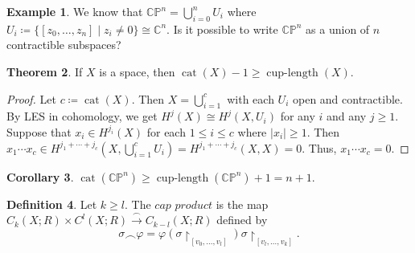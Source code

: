 \documentclass[10pt,letterpaper,cm]{nupset}
\theoremstyle{definition}
\newtheorem{definition}{Definition}[subsection]
\newtheorem{exmp}[definition]{Example}
\theoremstyle{theorem}
\newtheorem{theorem}[definition]{Theorem}
\newtheorem{corollary}[definition]{Corollary}
\theoremstyle{remark}
\newcommand{\C}{\mathbb C}
\newcommand{\CP}{\mathbb{CP}}
\newcommand{\1}{\mathbb{1}}
\newcommand{\0}{\vec 0}
\DeclareMathOperator{\clength}{cup{-}length}
\DeclareMathOperator{\cat}{cat}
\begin{document}
\begin{exmp}
We know that $\CP^n = \bigcup_{i=0}^n U_i$ where $U_i \coloneqq  \{[z_0, \ldots, z_n] \mid z_i \ne 0\} \cong \C^n$. Is it possible to write $\CP^n$ as a union of $n$ contractible subspaces?
\end{exmp}

\begin{theorem}
If $X$ is a space, then $\cat(X) -1 \geq \clength(X)$.
\end{theorem}
\begin{proof}
Let $c \coloneqq  \cat(X)$. Then $X = \bigcup_{i=1}^c$ with each $U_i$ open and contractible. By LES in cohomology, we get $H^j(X) \cong H^j(X, U_i)$ for any $i$ and any $j\geq 1$. Suppose that $x_i \in H^{j_i}(X)$ for each $1\leq i \leq c$ where $|x_i| \geq 1$. Then $x_1 \cdots x_c \in H^{j_1 + \cdots + j_c}(X, \bigcup_{i=1}^c U_i) = H^{j_1 + \cdots + j_c}(X, X)= 0$. Thus, $x_1 \cdots x_c =0$. 
\end{proof}

\begin{corollary}
$\cat(\CP^n) \geq \clength(\CP^n) +1 = n+1$.
\end{corollary}

\begin{definition}
Let $k\geq l$. The $\textit{cap product}$ is the map $C_k(X; R) \times C^l(X; R) \overset{\frown}{\longrightarrow} C_{k-l}(X; R)$ defined by $$ \sigma \frown  \varphi =  \varphi(\sigma \restriction_{[v_0, \ldots, v_l]})\sigma\restriction_{[v_l, \ldots, v_k]}.$$
\end{definition}
\end{document}
